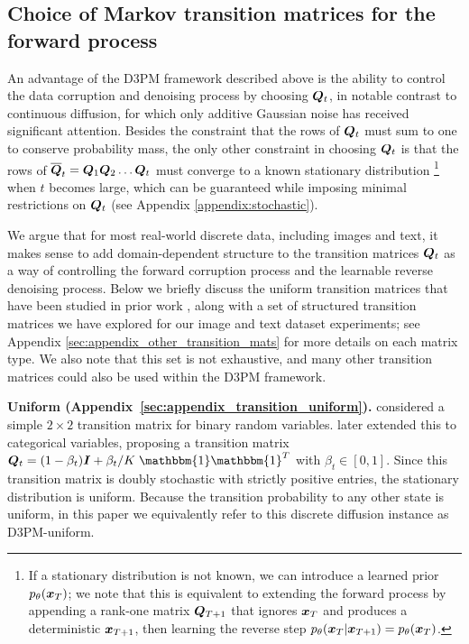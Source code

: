 \subsection{Choice of Markov transition matrices for the forward process}
\label{sec:choice-transition-matrices}

An advantage of the D3PM framework described above is the ability to control the data corruption and denoising process by choosing $\boldsymbol{Q}_t$, in notable contrast to continuous diffusion, for which only additive Gaussian noise has received significant attention.
Besides the constraint that the rows of $\boldsymbol{Q}_t$ must sum to one to conserve probability mass, the only other constraint in choosing $\boldsymbol{Q}_t$ is that the rows of $\overline{\boldsymbol{Q}}_{t} = \boldsymbol{Q}_1  \boldsymbol{Q}_2 \hdots \boldsymbol{Q}_t$ must converge to a known stationary distribution%
\footnote{If a stationary distribution is not known, we can introduce a learned prior $p_\theta(\boldsymbol{x}_{T})$; we note that this is equivalent to extending the forward process by appending a rank-one matrix $\boldsymbol{Q}_{T+1}$ that ignores $\boldsymbol{x}_{T}$ and produces a deterministic $\boldsymbol{x}_{T+1}$, then learning the reverse step $p_\theta(\boldsymbol{x}_T | \boldsymbol{x}_{T+1}) = p_\theta(\boldsymbol{x}_T)$.}
when $t$ becomes large, which can be guaranteed while imposing minimal restrictions on $\boldsymbol{Q}_t$ (see Appendix \ref{appendix:stochastic}).


We argue that for most real-world discrete data, including images and text,
it makes sense to add domain-dependent structure to the transition matrices $\boldsymbol{Q}_t$ as a way of controlling the forward corruption process and the learnable reverse denoising process.
Below we briefly discuss the uniform transition matrices that have been studied in prior work \citep{hoogeboom2021argmax}, along with a set of structured transition matrices we have explored for our image and text dataset experiments; see Appendix \ref{sec:appendix_other_transition_mats} for more details on each matrix type. We also note that this set is not exhaustive, and many other transition matrices could also be used within the D3PM framework.

\textbf{Uniform (Appendix~\ref{sec:appendix_transition_uniform}).} \citet{sohl2015deep} considered a simple $2\times 2$ transition matrix for binary random variables. \citet{hoogeboom2021argmax} later extended this to categorical variables, proposing a transition matrix $\bs{Q}_t = (1 - \beta_t) \bs I + \beta_t/K\; \mathbbm{1}\mathbbm{1}^T$ with $\beta_t\in[0, 1]$. Since this transition matrix is doubly stochastic with strictly positive entries, the stationary distribution is uniform.
Because the transition probability to any other state is uniform, in this paper we equivalently refer to this discrete diffusion instance as D3PM-uniform.

